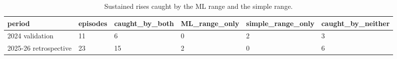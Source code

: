 \begin{table}
\caption{Sustained rises caught by the ML range and the simple range.}
\label{tab:r5b}
\begin{tabular}{llllll}
\toprule
period & episodes & caught\_by\_both & ML\_range\_only & simple\_range\_only & caught\_by\_neither \\
\midrule
2024 validation & 11 & 6 & 0 & 2 & 3 \\
2025-26 retrospective & 23 & 15 & 2 & 0 & 6 \\
\bottomrule
\end{tabular}
\end{table}
